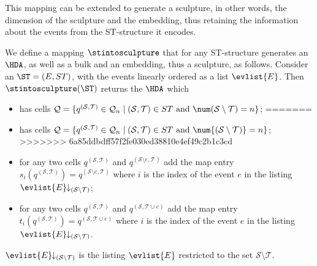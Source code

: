     This mapping can be extended to generate a sculpture, in other words, the dimension of the sculpture and the embedding, thus retaining the information about the events from the ST-structure it encodes.

    \begin{definition}
        \label{def:ST-to-Sculptures} 
        We define a mapping $\stintosculpture$ that for any ST-structure generates an $\HDA$, as well as a bulk and an embedding, thus a sculpture, as follows.  Consider an $\ST=(E,ST)$, with the events linearly ordered as a list $\evlist{E}$. Then $\stintosculpture(\ST)$ returns the $\HDA$ which
  
        \begin{itemize}
<<<<<<< HEAD
            \item has cells $\mathcal{Q}=\{q^{(\mathcal{S},\mathcal{T})}\in \mathcal{Q}_{n} \mid (\mathcal{S},\mathcal{T})\in ST \mbox{ and } \num(\mathcal{S} \setminus \mathcal{T})=n\}$;
=======
            \item has cells $\mathcal{Q}=\{q^{(\mathcal{S},\mathcal{T})}\in \mathcal{Q}_{n} \mid (\mathcal{S},\mathcal{T})\in ST \mbox{ and } \num{(\mathcal{S} \setminus \mathcal{T})}=n\}$;
>>>>>>> 6a85ddbdff57f2fe030ed38810e4ef49c2b1c3cd
            \item for any two cells $q^{(\mathcal{S},\mathcal{T})}$ and $q^{(\mathcal{S} \setminus e,\mathcal{T})}$ add the map entry $s_{i}(q^{(\mathcal{S},\mathcal{T})})=q^{(\mathcal{S} \setminus e,\mathcal{T})}$ where $i$ is the index of the event $e$ in the listing $\evlist{E}\!\!\downarrow_{(\mathcal{S} \setminus \mathcal{T})}$;
            \item for any two cells $q^{(\mathcal{S},\mathcal{T})}$ and $q^{(\mathcal{S},\mathcal{T} \cup e)}$ add the map entry $t_{i}(q^{(\mathcal{S},\mathcal{T})})=q^{(\mathcal{S},\mathcal{T} \cup e)}$ where $i$ is the index of the event $e$ in the listing $\evlist{E}\!\!\downarrow_{(\mathcal{S} \setminus \mathcal{T})}$.
        \end{itemize}
        
        $\evlist{E}\!\!\downarrow_{(\mathcal{S} \setminus \mathcal{T})}$ is the listing $\evlist{E}$ restricted to the set $\mathcal{S} \setminus \mathcal{T}$.
    
 

\end{definition}
